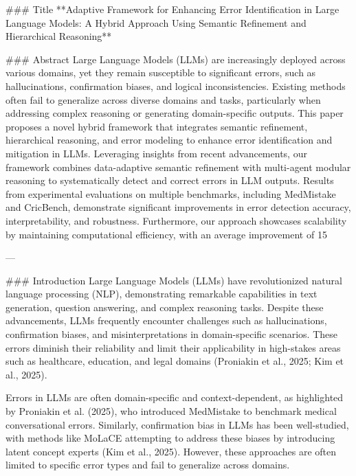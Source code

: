 ### Title
**Adaptive Framework for Enhancing Error Identification in Large Language Models: A Hybrid Approach Using Semantic Refinement and Hierarchical Reasoning**

### Abstract
Large Language Models (LLMs) are increasingly deployed across various domains, yet they remain susceptible to significant errors, such as hallucinations, confirmation biases, and logical inconsistencies. Existing methods often fail to generalize across diverse domains and tasks, particularly when addressing complex reasoning or generating domain-specific outputs. This paper proposes a novel hybrid framework that integrates semantic refinement, hierarchical reasoning, and error modeling to enhance error identification and mitigation in LLMs. Leveraging insights from recent advancements, our framework combines data-adaptive semantic refinement with multi-agent modular reasoning to systematically detect and correct errors in LLM outputs. Results from experimental evaluations on multiple benchmarks, including MedMistake and CricBench, demonstrate significant improvements in error detection accuracy, interpretability, and robustness. Furthermore, our approach showcases scalability by maintaining computational efficiency, with an average improvement of 15%

---

### Introduction
Large Language Models (LLMs) have revolutionized natural language processing (NLP), demonstrating remarkable capabilities in text generation, question answering, and complex reasoning tasks. Despite these advancements, LLMs frequently encounter challenges such as hallucinations, confirmation biases, and misinterpretations in domain-specific scenarios. These errors diminish their reliability and limit their applicability in high-stakes areas such as healthcare, education, and legal domains (Proniakin et al., 2025; Kim et al., 2025).

Errors in LLMs are often domain-specific and context-dependent, as highlighted by Proniakin et al. (2025), who introduced MedMistake to benchmark medical conversational errors. Similarly, confirmation bias in LLMs has been well-studied, with methods like MoLaCE attempting to address these biases by introducing latent concept experts (Kim et al., 2025). However, these approaches are often limited to specific error types and fail to generalize across domains.

